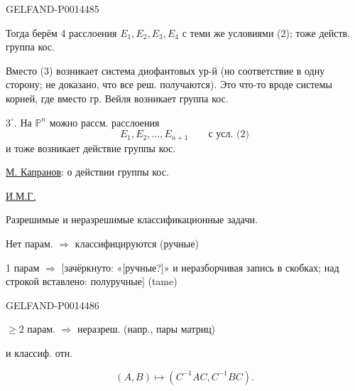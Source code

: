 \begin{GelfandAdjacentEvidence}{GELFAND-P001448}{5}


Тогда берём 4 расслоения \(E_1,E_2,E_3,E_4\) с теми же условиями (2); тоже действ. группа кос.

Вместо (3) возникает система диофантовых ур-й
(но соответствие в одну сторону; не доказано, что все реш. получаются).
Это что-то вроде системы корней, где вместо гр. Вейля возникает группа кос.

\(3^{\circ}\). На \(\mathbb{P}^{n}\) можно рассм. расслоения
\begin{equation*}
E_1,E_2,\ldots,E_{n+1}\qquad\text{с усл. (2)}
\end{equation*}
и тоже возникает действие группы кос.

\uline{М. Капранов}: о действии группы кос.

\uline{И.М.Г.}

Разрешимые и неразрешимые классификационные задачи.

Нет парам. \(\Rightarrow\) классифицируются (ручные)

1 парам \(\Rightarrow\)
[зачёркнуто: «[ручные?]» и неразборчивая запись в скобках; над строкой вставлено: полуручные] (tame)
\end{GelfandAdjacentEvidence}
\begin{GelfandAdjacentEvidence}{GELFAND-P001448}{6}


\(\geq 2\) парам. \(\Rightarrow\) неразреш. (напр., пары матриц)

и классиф. отн.
\end{GelfandAdjacentEvidence}

\begin{equation*}
(A,B)\mapsto(C^{-1}AC,C^{-1}BC).
\end{equation*}


